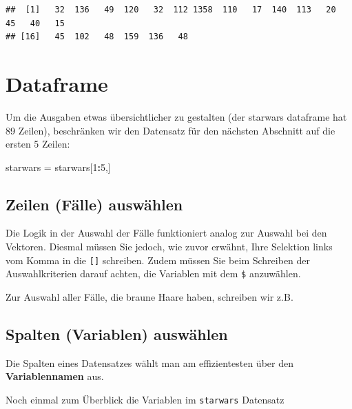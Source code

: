 \documentclass[
]{book}
\newenvironment{Shaded}{\begin{snugshade}}{\end{snugshade}}
\newcommand{\CommentTok}[1]{\textcolor[rgb]{0.56,0.35,0.01}{\textit{#1}}}
\newcommand{\DecValTok}[1]{\textcolor[rgb]{0.00,0.00,0.81}{#1}}
\newcommand{\NormalTok}[1]{#1}
\newcommand{\OtherTok}[1]{\textcolor[rgb]{0.56,0.35,0.01}{#1}}
\newcommand{\SpecialCharTok}[1]{\textcolor[rgb]{0.81,0.36,0.00}{\textbf{#1}}}
\begin{document}
\begin{verbatim}
##  [1]   32  136   49  120   32  112 1358  110   17  140  113   20   45   40   15
## [16]   45  102   48  159  136   48
\end{verbatim}

\section{Dataframe}\label{dataframe}

Um die Ausgaben etwas übersichtlicher zu gestalten (der starwars dataframe hat 89 Zeilen), beschränken wir den Datensatz für den nächsten Abschnitt auf die ersten 5 Zeilen:

\begin{Shaded}
\begin{Highlighting}[]
\NormalTok{starwars }\OtherTok{=}\NormalTok{ starwars[}\DecValTok{1}\SpecialCharTok{:}\DecValTok{5}\NormalTok{,]}
\end{Highlighting}
\end{Shaded}

\subsection{Zeilen (Fälle) auswählen}\label{zeilen-fuxe4lle-auswuxe4hlen}

Die Logik in der Auswahl der Fälle funktioniert analog zur Auswahl bei den Vektoren. Diesmal müssen Sie jedoch, wie zuvor erwähnt, Ihre Selektion links vom Komma in die \texttt{{[}{]}} schreiben. Zudem müssen Sie beim Schreiben der Auswahlkriterien darauf achten, die Variablen mit dem \texttt{\$} anzuwählen.

Zur Auswahl aller Fälle, die braune Haare haben, schreiben wir z.B.

\begin{Shaded}
\end{Shaded}

\subsection{Spalten (Variablen) auswählen}\label{spalten-variablen-auswuxe4hlen}

Die Spalten eines Datensatzes wählt man am effizientesten über den \textbf{Variablennamen} aus.

Noch einmal zum Überblick die Variablen im \texttt{starwars} Datensatz
\end{document}
